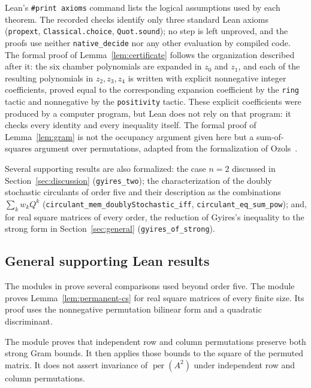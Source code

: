 \documentclass[11pt,a4paper]{article}
\theoremstyle{definition}
\theoremstyle{remark}
\newcommand{\per}{\operatorname{per}}
\newcommand{\lean}[1]{\texttt{#1}}
\begin{document}
Lean's \texttt{\#print axioms} command lists the logical assumptions used by each theorem.
The recorded checks identify only three standard Lean axioms
(\texttt{propext}, \texttt{Classical.choice}, \texttt{Quot.sound}); no step is left unproved, and the proofs use neither
\texttt{native\_decide} nor any other evaluation by compiled code. The formal proof of Lemma~\ref{lem:certificate}
follows the organization described after it: the six chamber polynomials are expanded in $z_0$ and $z_1$, and each of
the resulting polynomials in $z_2,z_3,z_4$ is written with explicit nonnegative integer coefficients, proved equal to the
corresponding expansion coefficient by the \texttt{ring} tactic and nonnegative by the \texttt{positivity} tactic. These explicit
coefficients were produced by a computer program, but Lean does not rely on that program: it checks every identity and
every inequality itself. The formal proof of Lemma~\ref{lem:gram} is not the occupancy argument given here but a
sum-of-squares argument over permutations, adapted from the formalization of Ozols~\cite{ozols}.

Several supporting results are also formalized: the case $n=2$ discussed in Section~\ref{sec:discussion} (\lean{gyires\_two}); the characterization of
the doubly stochastic circulants of order five and their description as the combinations $\sum_kw_kQ^k$
(\lean{circulant\_mem\_doublyStochastic\_iff}, \lean{circulant\_eq\_sum\_pow}); and, for real square matrices of
every order, the reduction of Gyires's inequality to the strong form in Section~\ref{sec:general}
(\lean{gyires\_of\_strong}).

\subsection{General supporting Lean results}

The modules in  prove several comparisons used beyond order five.
The module  proves Lemma~\ref{lem:permanent-cs} for real square matrices of every finite size.
Its proof uses the nonnegative permutation bilinear form and a quadratic discriminant.

The module  proves that independent row and column permutations preserve both strong Gram bounds.
It then applies those bounds to the square of the permuted matrix.
It does not assert invariance of $\per(A^2)$ under independent row and column permutations.
\end{document}
